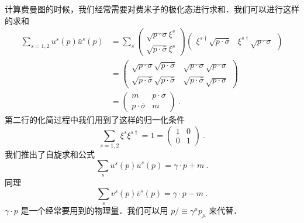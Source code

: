 
计算费曼图的时候，我们经常需要对费米子的极化态进行求和．我们可以进行这样的求和
\begin{align}\nonumber
\sum_{s = 1,2}u^s(p)\bar u^s(p ) & = \sum_s \begin{pmatrix}
\sqrt{p\cdot \sigma}\xi^s \\
\sqrt{p\cdot\bar\sigma} \xi^s
\end{pmatrix}\begin{pmatrix}
\xi^{s\dagger}\sqrt{p\cdot\bar\sigma} & \xi^{s\dagger}\sqrt{p\cdot \sigma}
\end{pmatrix}\\\nonumber
& = \begin{pmatrix}
\sqrt{p\cdot\sigma}\sqrt{p\cdot \bar \sigma} & \sqrt{p\cdot \sigma}\sqrt{p\cdot\sigma} \\
\sqrt{p\cdot\bar\sigma} \sqrt{p\cdot \bar\sigma} & \sqrt{p\cdot\bar\sigma} \sqrt{p\cdot\sigma}
\end{pmatrix} \\
& = \begin{pmatrix}
m & p\cdot \sigma \\
p\cdot \bar \sigma & m
\end{pmatrix}~.
\end{align}
第二行的化简过程中我们用到了这样的归一化条件
\begin{equation}
\sum_{s=1,2}\xi^s\xi^{s\dagger} = 1 = \begin{pmatrix}
1 & 0 \\
0 & 1
\end{pmatrix}~.
\end{equation}
我们推出了自旋求和公式
\begin{equation}
\sum_s u^s(p)\bar u^s(p) = \gamma \cdot p + m ~.
\end{equation}
同理
\begin{equation}
\sum_s v^s(p)\bar v^s(p) = \gamma\cdot p - m ~.
\end{equation}
$\gamma \cdot p$ 是一个经常要用到的物理量．我们可以用 $p\!\!\!/\equiv \gamma^\mu p_\mu$ 来代替．

